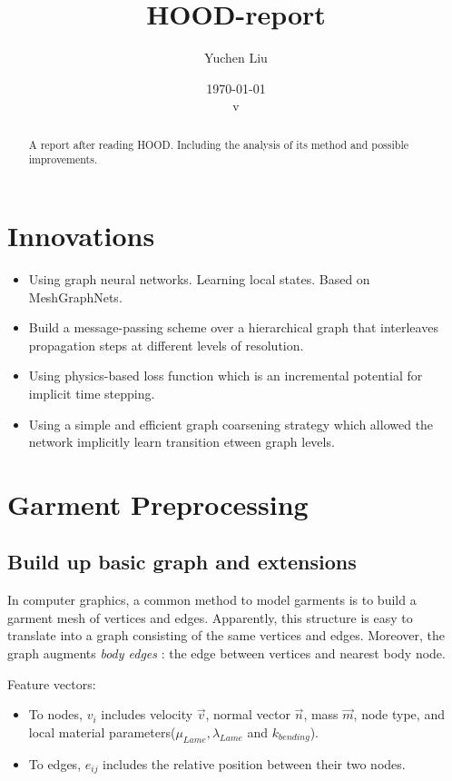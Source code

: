 \documentclass{article}
\title{HOOD-report}
\author{Yuchen Liu}
\date{\today \\ v\version}
\begin{document}
\maketitle
\tableofcontents
\begin{abstract}
    A report after reading HOOD\cite{grigorev2023hood}. Including the analysis of its method and possible improvements.
\end{abstract}
\newpage
\section{Innovations}
\begin{itemize}
    \item Using graph neural networks. Learning local states. Based on MeshGraphNets\cite{pfaff2021learning}.
    \item Build a message-passing scheme over a hierarchical graph that interleaves propagation steps at different levels of resolution.
    \item Using physics-based loss function which is an incremental potential for implicit time stepping.
    \item Using a simple and efficient graph coarsening strategy which allowed the network implicitly learn transition etween graph levels.
\end{itemize}

\section{Garment Preprocessing}
\subsection{Build up basic graph and extensions}
\par In computer graphics, a common method to model garments is to build a garment mesh of vertices and edges. Apparently, this structure is easy to translate into a graph consisting of the same vertices and edges. Moreover, the graph augments \textit{body edges} : the edge between vertices and nearest body node.
\par Feature vectors:
\begin{itemize}
    \item To nodes, $v_i$ includes velocity $\vec{v}$, normal vector $\vec{n}$, mass $\vec{m}$, node type, and local material parameters($\mu_{Lame}, \lambda_{Lame}$ and $k_{bending} $).
    \item To edges, $e_{ij}$ includes the relative position between their two nodes.
\end{itemize}
\par 
\end{document}

